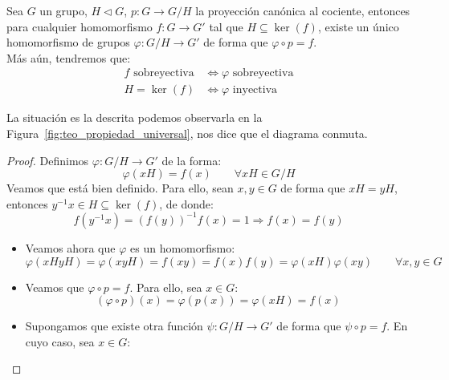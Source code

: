 \begin{teo}\label{teo:prop_universal}
    Sea $G$ un grupo, $H\lhd G$, $p:G\to G/H$ la proyección canónica al cociente, entonces para cualquier homomorfismo $f:G\to G'$ tal que $H\subseteq \ker(f)$, existe un único homomorfismo de grupos $\varphi:G/H\to G'$ de forma que $\varphi\circ p = f$.\\

    Más aún, tendremos que:
    \begin{align*}
        f \text{\ sobreyectiva} &\Longleftrightarrow \varphi \text{\ sobreyectiva}\\
        H = \ker(f) &\Longleftrightarrow \varphi \text{\ inyectiva}
    \end{align*}

    \noindent
    La situación es la descrita podemos observarla en la Figura~\ref{fig:teo_propiedad_universal}, nos dice que el diagrama conmuta.
    \begin{proof}
        Definimos $\varphi:G/H\to G'$ de la forma:
        \begin{equation*}
            \varphi(xH) = f(x) \qquad \forall xH \in G/H
        \end{equation*}
        Veamos que está bien definido. Para ello, sean $x,y\in G$ de forma que $xH = yH$, entonces $y^{-1}x\in H\subseteq \ker(f)$, de donde:
        \begin{equation*}
            f(y^{-1}x) = {(f(y))}^{-1}f(x) = 1 \Longrightarrow f(x) = f(y)
        \end{equation*}
        \begin{itemize}
            \item Veamos ahora que $\varphi$ es un homomorfismo:
                \begin{equation*}
                    \varphi(xHyH) = \varphi(xyH) = f(xy) = f(x) f(y) = \varphi(xH)\varphi(xy) \qquad \forall x,y\in G
                \end{equation*}
            \item Veamos que $\varphi\circ p = f$. Para ello, sea $x\in G$:
                \begin{equation*}
                    (\varphi \circ p)(x) = \varphi(p(x)) = \varphi(xH) = f(x)
                \end{equation*}
            \item Supongamos que existe otra función $\psi:G/H\to G'$ de forma que $\psi\circ p = f$. En cuyo caso, sea $x\in G$:
                \begin{equation*}

\end{equation*}
\end{itemize}
\end{proof}
\end{teo}
